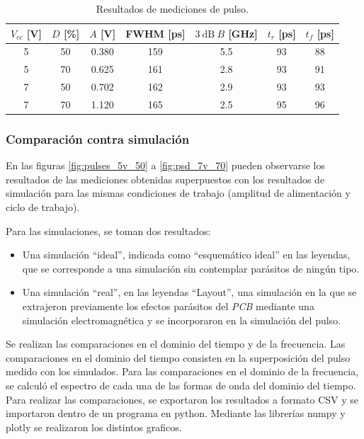 \begin{table}[t!]
\centering
\begin{tabular}{ccccccc}
\hline
$V_{cc}$ [\unit{\volt}] & $D$ [\unit{\percent}] & $A$ [\unit{\volt}] &
    FWHM [\unit{\pico\second}] & $\qty{3}{\dB} \ B$ [\unit{\giga\hertz}]& $t_r$
    [\unit{\pico\second}]& $t_f$ [\unit{\pico\second}]\\
\hline
5 & 50 & 0.380 & 159 & 5.5 & 93 & 88 \\
5 & 70 & 0.625 & 161 & 2.8 & 93 & 91 \\
7 & 50 & 0.702 & 162 & 2.9 & 93 & 93 \\
7 & 70 & 1.120 & 165 & 2.5 & 95 & 96 \\
\hline
\end{tabular}
\caption{Resultados de mediciones de pulso.}
\label{tab:mediciones_pulso_resultados}
\end{table}

\subsubsection{Comparación contra simulación}
\label{sec:comp_simulacion}

En las figuras \ref{fig:pulses_5v_50} a \ref{fig:psd_7v_70} pueden observarse
los resultados de las mediciones obtenidas superpuestos con los resultados de
simulación para las mismas condiciones de trabajo (amplitud de alimentación y
ciclo de trabajo).

Para las simulaciones, se toman dos resultados:

\begin{itemize}
    \item Una simulación ``ideal'', indicada como ``esquemático ideal'' en las
      leyendas, que se corresponde a una simulación sin contemplar parásitos de
      ningún tipo.
    \item Una simulación ``real'', en las leyendas ``Layout'', una simulación en
      la que se extrajeron previamente los efectos parásitos del \textit{PCB}
      mediante una simulación electromagnética y se incorporaron en la
      simulación del pulso.
\end{itemize}

Se realizan las comparaciones en el dominio del tiempo y de la frecuencia. Las
comparaciones en el dominio del tiempo consisten en la superposición del pulso
medido con los simulados. Para las comparaciones en el dominio de la frecuencia,
se calculó el espectro de cada una de las formas de onda del dominio del tiempo.
Para realizar las comparaciones, se exportaron los resultados a formato CSV y se
importaron dentro de un programa en python. Mediante las librerías numpy y
plotly se realizaron los distintos graficos.

